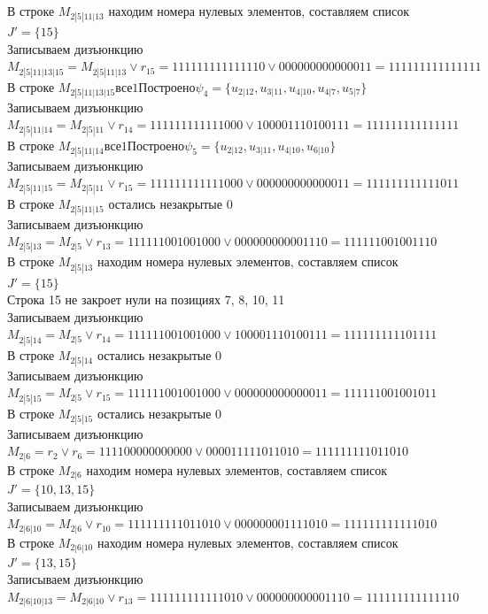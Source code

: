 \documentclass[12pt,a4paper]{report}
\begin{document}
В строке $M_{2 | 5 | 11 | 13}$ находим номера нулевых элементов, составляем список $J' = \{15\}$ \\
Записываем дизъюнкцию $M_{2 | 5 | 11 | 13 | 15} = M_{2 | 5 | 11 | 13}\vee r_{15} = 111111111111110 \vee 000000000000011 = 111111111111111$ \\
В строке $M_{2 | 5 | 11 | 13 | 15} все 1 Построено \psi_{4} = \{u_{2 | 12},u_{3 | 11},u_{4 | 10},u_{4 | 7},u_{5 | 7}\}$ \\
Записываем дизъюнкцию $M_{2 | 5 | 11 | 14} = M_{2 | 5 | 11}\vee r_{14} = 111111111111000 \vee 100001110100111 = 111111111111111$ \\
В строке $M_{2 | 5 | 11 | 14} все 1 Построено \psi_{5} = \{u_{2 | 12},u_{3 | 11},u_{4 | 10},u_{6 | 10}\}$ \\
Записываем дизъюнкцию $M_{2 | 5 | 11 | 15} = M_{2 | 5 | 11}\vee r_{15} = 111111111111000 \vee 000000000000011 = 111111111111011$ \\
В строке $M_{2 | 5 | 11 | 15}$ остались незакрытые $0$ \\
Записываем дизъюнкцию $M_{2 | 5 | 13} = M_{2 | 5}\vee r_{13} = 111111001001000 \vee 000000000001110 = 111111001001110$ \\
В строке $M_{2 | 5 | 13}$ находим номера нулевых элементов, составляем список $J' = \{15\}$ \\
Строка 15 не закроет нули на позициях 7, 8, 10, 11 \\
Записываем дизъюнкцию $M_{2 | 5 | 14} = M_{2 | 5}\vee r_{14} = 111111001001000 \vee 100001110100111 = 111111111101111$ \\
В строке $M_{2 | 5 | 14}$ остались незакрытые $0$ \\
Записываем дизъюнкцию $M_{2 | 5 | 15} = M_{2 | 5}\vee r_{15} = 111111001001000 \vee 000000000000011 = 111111001001011$ \\
В строке $M_{2 | 5 | 15}$ остались незакрытые $0$ \\
Записываем дизъюнкцию $M_{2 | 6} = r_{2}\vee r_{6} = 111100000000000 \vee 000011111011010 = 111111111011010$ \\
В строке $M_{2 | 6}$ находим номера нулевых элементов, составляем список $J' = \{10, 13, 15\}$ \\
Записываем дизъюнкцию $M_{2 | 6 | 10} = M_{2 | 6}\vee r_{10} = 111111111011010 \vee 000000001111010 = 111111111111010$ \\
В строке $M_{2 | 6 | 10}$ находим номера нулевых элементов, составляем список $J' = \{13, 15\}$ \\
Записываем дизъюнкцию $M_{2 | 6 | 10 | 13} = M_{2 | 6 | 10}\vee r_{13} = 111111111111010 \vee 000000000001110 = 111111111111110$ \\
\end{document}
